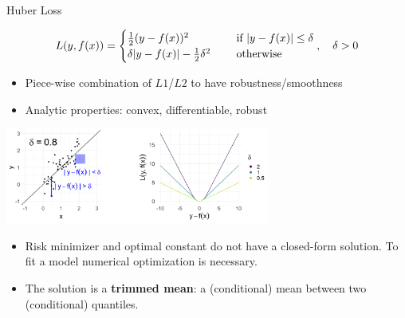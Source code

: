 \begin{vbframe}{Huber Loss}

\vspace*{-0.5cm}

$$
L(y, f(x)) = \begin{cases}
  \frac{1}{2}(y - f(x))^2  & \text{ if } |y - f(x)| \le \delta \\
  \delta |y - f(x)|-\frac{1}{2}\delta^2 \quad & \text{ otherwise }
  \end{cases}, \quad \delta > 0
$$

\begin{itemize}
\item Piece-wise combination of $L1$/$L2$ to have robustness/smoothness
\item Analytic properties: convex, differentiable, robust
\end{itemize}



\begin{center}
\includegraphics[width = 0.65\textwidth]{figure/loss_huber_plot.png}
\end{center}

\vspace*{-0.2cm}

\begin{itemize}
\item Risk minimizer and optimal constant do not have a closed-form solution. To fit a model numerical optimization is necessary. 
\item The solution is a \textbf{trimmed mean}: a (conditional) mean between two (conditional) quantiles. %
\end{itemize}


\end{vbframe}
